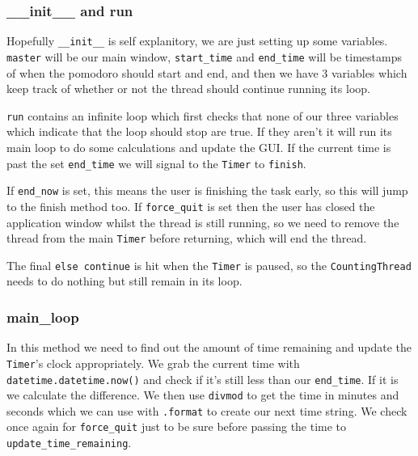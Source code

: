 \documentclass[a4paper,11pt,openany]{book}
\begin{document}
\subsubsection{\_\_init\_\_ and run}

Hopefully \lstinline[columns=fixed]{__init__} is self explanitory, we are just setting up some variables. \lstinline[columns=fixed]{master} will be our main window, \lstinline[columns=fixed]{start_time} and \lstinline[columns=fixed]{end_time} will be timestamps of when the pomodoro should start and end, and then we have 3 variables which keep track of whether or not the thread should continue running its loop. 

\vspace{5mm}

\lstinline[columns=fixed]{run} contains an infinite loop which first checks that none of our three variables which indicate that the loop should stop are true. If they aren't it will run its main loop to do some calculations and update the GUI. If the current time is past the set \lstinline[columns=fixed]{end_time} we will signal to the \lstinline[columns=fixed]{Timer} to \lstinline[columns=fixed]{finish}. 

\vspace{5mm}

If \lstinline[columns=fixed]{end_now} is set, this means the user is finishing the task early, so this will jump to the finish method too. If \lstinline[columns=fixed]{force_quit} is set then the user has closed the application window whilst the thread is still running, so we need to remove the thread from the main \lstinline[columns=fixed]{Timer} before returning, which will end the thread. 

\vspace{5mm}

The final \lstinline[columns=fixed]{else continue} is hit when the \lstinline[columns=fixed]{Timer} is paused, so the \lstinline[columns=fixed]{CountingThread} needs to do nothing but still remain in its loop. 

\subsubsection{main\_loop}

In this method we need to find out the amount of time remaining and update the \lstinline[columns=fixed]{Timer}'s clock appropriately. We grab the current time with \lstinline[columns=fixed]{datetime.datetime.now()} and check if it's still less than our \lstinline[columns=fixed]{end_time}. If it is we calculate the difference. We then use \lstinline[columns=fixed]{divmod} to get the time in minutes and seconds which we can use with \lstinline[columns=fixed]{.format} to create our next time string. We check once again for \lstinline[columns=fixed]{force_quit} just to be sure before passing the time to \lstinline[columns=fixed]{update_time_remaining}.  
\end{document}
